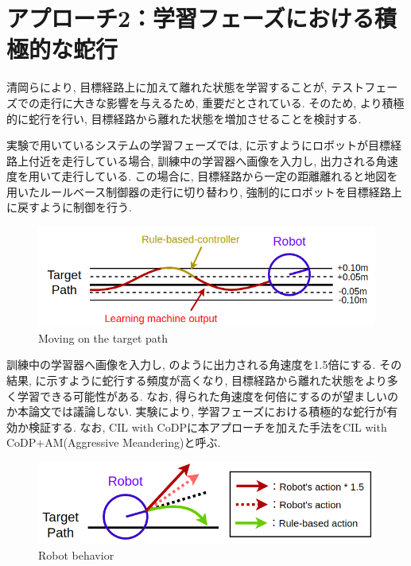 

\newpage

\section{アプローチ2：学習フェーズにおける積極的な蛇行}
清岡ら\cite{kiyooka}により, 目標経路上に加えて離れた状態を学習することが, テストフェーズでの走行に大きな影響を与えるため, 重要だとされている. そのため, より積極的に蛇行を行い, 目標経路から離れた状態を増加させることを検討する. \par
実験で用いているシステムの学習フェーズでは,  に示すようにロボットが目標経路上付近を走行している場合, 訓練中の学習器へ画像を入力し, 出力される角速度を用いて走行している. この場合に, 目標経路から一定の距離離れると地図を用いたルールベース制御器の走行に切り替わり, 強制的にロボットを目標経路上に戻すように制御を行う. 

\begin{figure}[hbtp]
  \centering
 \includegraphics[keepaspectratio, scale=0.58]
      {images/act1.0.png}
 \caption{Moving on the target path}
 \label{Fig:act1.0}
\end{figure}

訓練中の学習器へ画像を入力し, のように出力される角速度を1.5倍にする. その結果, に示すように蛇行する頻度が高くなり, 目標経路から離れた状態をより多く学習できる可能性がある. なお, 得られた角速度を何倍にするのが望ましいのか本論文では議論しない. 実験により, 学習フェーズにおける積極的な蛇行が有効か検証する. なお, CIL with CoDPに本アプローチを加えた手法をCIL with CoDP+AM(Aggressive Meandering)と呼ぶ.

\begin{figure}[hbtp]
  \centering
 \includegraphics[keepaspectratio, scale=0.5]
      {images/3action2.png}
 \caption{Robot behavior}
 \label{Fig:3action}
\end{figure}

